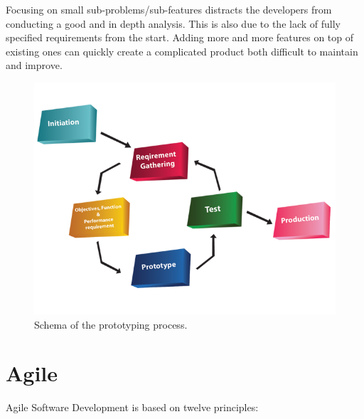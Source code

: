 \documentclass[12pt]{article}
\theoremstyle{definition}
\theoremstyle{definition}
\theoremstyle{remark}
\begin{document}
Focusing on small sub-problems/sub-features distracts the developers from conducting a good and in depth analysis. This is also due to the lack of fully specified requirements from the start. Adding more and more features on top of existing ones can quickly create a complicated product both difficult to maintain and improve.\\

\begin{figure}
    \centering
    \includegraphics[scale=0.4]{prototyping.png}
    \caption{Schema of the prototyping process.}
    \label{Prototyping}
\end{figure}



\section{Agile}


Agile Software Development is based on twelve principles:~\cite{agile_manifesto:2018}
\end{document}
